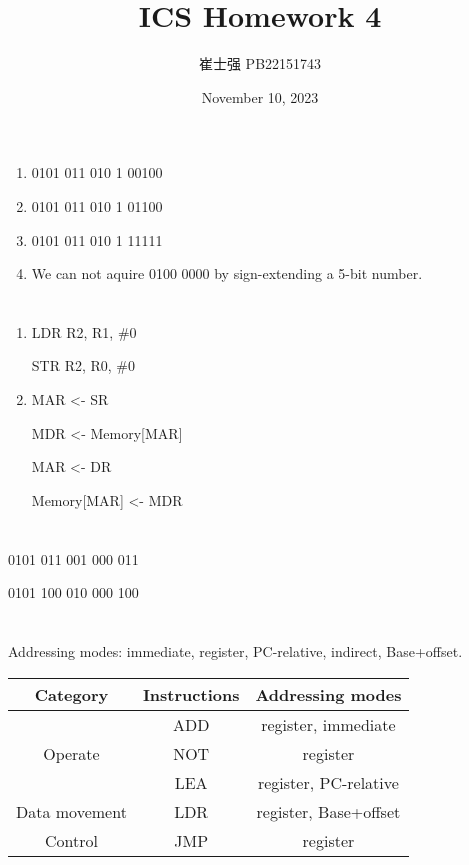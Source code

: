 \documentclass[UTF8]{ctexart}
\title{ICS Homework 4}
\author{崔士强 PB22151743}
\date{November 10, 2023}
\begin{document}
\maketitle
\section{}  %
\begin{enumerate}
  \item 0101 011 010 1 00100
  \item 0101 011 010 1 01100
  \item 0101 011 010 1 11111
  \item We can not aquire 0100 0000 by sign-extending a 5-bit number.
\end{enumerate}
\section{} %
\section{} %
\begin{enumerate}
  \item LDR R2, R1, \#0
  
        STR R2, R0, \#0
  \item MAR <- SR
  
        MDR <- Memory[MAR]
        
        MAR <- DR

        Memory[MAR] <- MDR
\end{enumerate}
\section{} %
0101 011 001 000 011

0101 100 010 000 100
\section{} %
Addressing modes: immediate, register, PC-relative, indirect, Base+offset.
\begin{table}[H]
  \centering
  \begin{tabular}{ccc}
    \hline\hline
    Category & Instructions & Addressing modes \\
    \hline
    \multirow{3}{*}{Operate} & ADD & register, immediate \\
                             & NOT & register \\
                             & LEA & register, PC-relative \\
    \hline
    Data movement & LDR & register, Base+offset \\
    \hline
    Control & JMP & register \\
    \hline\hline
  \end{tabular}
\end{table}
\end{document}

